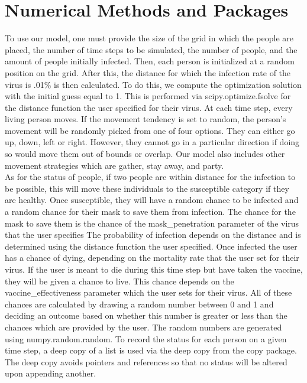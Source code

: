 \documentclass{article}
\begin{document}
\section{Numerical Methods and Packages}

To use our model, one must provide the size of the grid in which the people are placed, the number of time steps to be simulated, the number of people, and the amount of people initially infected. Then, each person is initialized at a random position on the grid. After this, the distance for which the infection rate of the virus is .01\% is then calculated. To do this, we compute the optimization solution with the initial guess equal to 1. This is performed via scipy.optimize.fsolve for the distance function the user specified for their virus. At each time step, every living person moves. If the movement tendency is set to random, the person's movement will be randomly picked from one of four options. They can either go up, down, left or right. However, they cannot go in a particular direction if doing so would move them out of bounds or overlap. Our model also includes other movement strategies which are gather, stay away, and party.\\ 
\indent As for the status of people, if two people are within distance for the infection to be possible, this will move these individuals to the susceptible category if they are healthy. Once susceptible, they will have a random chance to be infected and a random chance for their mask to save them from infection. The chance for the mask to save them is the chance of the mask\_penetration parameter of the virus that the user specifies The probability of infection depends on the distance and is determined using the distance function the user specified. Once infected the user has a chance of dying, depending on the mortality rate that the user set for their virus. If the user is meant to die during this time step but have taken the vaccine, they will be given a chance to live. This chance depends on the vaccine\_effectiveness parameter which the user sets for their virus. All of these chances are calculated by drawing a random number between 0 and 1 and deciding an outcome based on whether this number is greater or less than the chances which are provided by the user. The random numbers are generated using numpy.random.random. To record the status for each person on a given time step, a deep copy of a list is used via the deep copy from the copy package. The deep copy avoids pointers and references so that no status will be altered upon appending another. 
\end{document}
